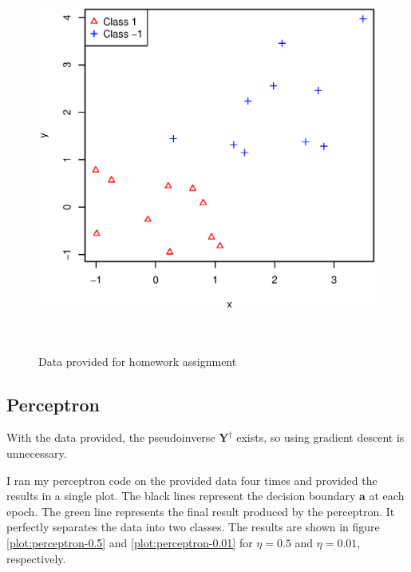 \documentclass{article}
\begin{document}
\begin{figure}[htb]
	\centering
	\includegraphics[width=5in,height=5in]{plots/raw_data.eps}
	\caption{Data provided for homework assignment}
	\label{plot:raw_data}
\end{figure}

\subsection{Perceptron} 

With the data provided, the pseudoinverse $\mathbf{Y}^{\dagger}$ exists, so
using gradient descent is unnecessary.

I ran my perceptron code on the provided data four times and provided the
results in a single plot. The black lines represent the decision boundary
$\mathbf{a}$ at each epoch. The green line represents the final result produced
by the perceptron. It perfectly separates the data into two classes. The results
are shown in figure \ref{plot:perceptron-0.5} and \ref{plot:perceptron-0.01} for
$\eta=0.5$ and $\eta=0.01$, respectively.
\end{document}
